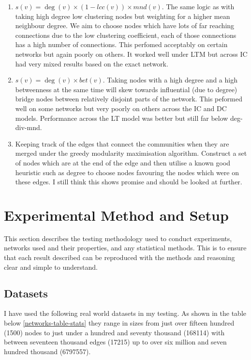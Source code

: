 \documentclass{article}
\begin{document}
\begin{enumerate}
	\item $s(v) = \deg(v) \times (1 - lcc(v)) \times mnd(v)$.
	      The same logic as with taking high degree low clustering nodes but weighting for a higher mean neighbour degree.
	      We aim to choose nodes which have lots of far reaching connections due to the low clustering coefficient, each of those connections has a high number of connections. This perfomed acceptably on certain networks but again poorly on others. It worked well under LTM but across IC had very mixed results based on the exact network.
	\item $s(v) = \deg(v) \times bet(v)$. Taking nodes with a high degree and a high betweenness at the same time will skew towards influential (due to degree) bridge nodes between relatively disjoint parts of the network. This peformed well on some networks but very poorly on others across the IC and DC models. Performance across the LT model was better but still far below deg-div-mnd.
	\item Keeping track of the edges that connect the communities when they are merged under the greedy modularity maximisation algorithm. Construct a set of nodes which are at the end of the edge and then utilise a known good heuristic such as degree to choose nodes favouring the nodes which were on these edges. I still think this shows promise and should be looked at further.
\end{enumerate}


\newpage
\section{Experimental Method and Setup}

This section describes the testing methodology used to conduct experiments, networks used and their properties, and any statistical methods.
This is to ensure that each result described can be reproduced with the methods and reasoning clear and simple to understand.

\subsection{Datasets}

I have used the following real world datasets in my testing.
As shown in the table below \ref{networks-table-stats} they range in sizes from just over fifteen hundred (1500) nodes to just under a hundred and seventy thousand (168114) with between seventeen thousand edges (17215) up to over six million and seven hundred thousand (6797557).
\end{document}
